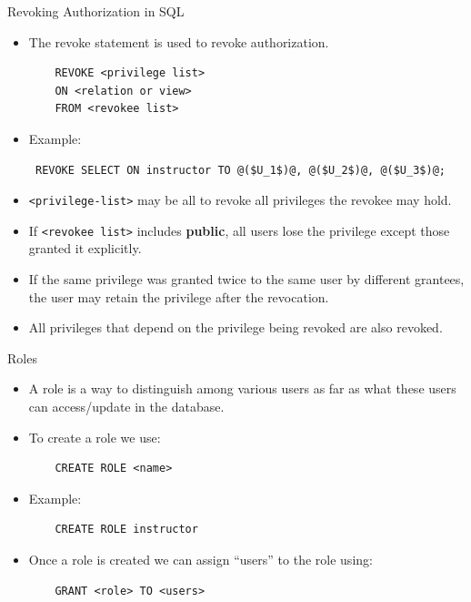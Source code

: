 \documentclass{beamer}
\begin{document}
\begin{frame}[fragile]{Revoking Authorization in SQL}
    \begin{itemize}
        \item The revoke statement is used to revoke authorization.
            \begin{verbatim}
    REVOKE <privilege list>
    ON <relation or view>
    FROM <revokee list>
            \end{verbatim}
        \item Example:
            \begin{lstlisting}
 REVOKE SELECT ON instructor TO @($U_1$)@, @($U_2$)@, @($U_3$)@;
            \end{lstlisting}
        \item \verb|<privilege-list>| may be all to revoke all privileges the revokee may hold.
        \item If \verb|<revokee list>| includes \textbf{public}, all users lose the privilege except those granted it explicitly.
        \item If the same privilege was granted twice to the same user by different grantees, the user may retain the privilege after the revocation.
        \item All privileges that depend on the privilege being revoked are also revoked.
    \end{itemize}
\end{frame}

\begin{frame}[fragile]{Roles}
    \begin{itemize}
        \item A role is a way to distinguish among various users as far as what these users can access/update in the database.
        \item To create a role we use:
            \begin{verbatim}
    CREATE ROLE <name>
            \end{verbatim}
        \item Example:
            \begin{verbatim}
    CREATE ROLE instructor
            \end{verbatim}
        \item Once a role is created we can assign ``users'' to the role using:
            \begin{verbatim}
    GRANT <role> TO <users>
            \end{verbatim}
    \end{itemize}
\end{frame}
\end{document}
